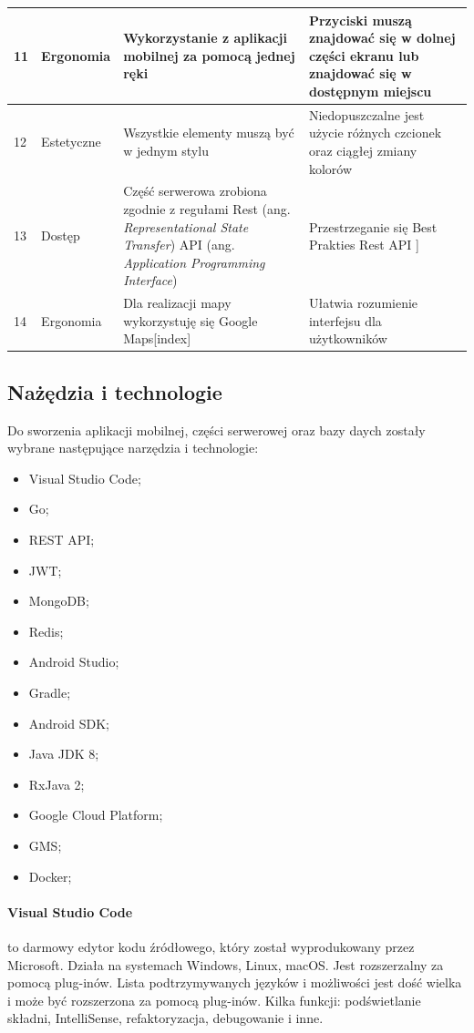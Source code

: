 \begin{table}[htb]
\begin{tabular}{| m{0.5cm} | m{3cm} | m{5.75cm} | m{5.75cm} |}
    \hline
    11 & Ergonomia & Wykorzystanie z aplikacji mobilnej za pomocą jednej ręki & Przyciski muszą znajdować się w dolnej części ekranu lub znajdować się w dostępnym miejscu \\
    \hline
    12 & Estetyczne & Wszystkie elementy muszą być w jednym stylu & Niedopuszczalne jest użycie różnych czcionek oraz ciągłej zmiany kolorów \\
    \hline
    13 & Dostęp & Część serwerowa zrobiona zgodnie z regułami Rest (ang. \textit{Representational State Transfer}) API (ang. \textit{Application Programming Interface}) & Przestrzeganie się Best Prakties Rest API \cite{rest_api_best}] \\
    \hline
    14 & Ergonomia & Dla realizacji mapy wykorzystuję się Google Maps[index] & Ułatwia rozumienie interfejsu dla użytkowników \\
    \hline
\end{tabular}
\end{table}
\newpage
\subsection{Nażędzia i technologie}
Do sworzenia aplikacji mobilnej, części serwerowej oraz bazy daych zostały wybrane następujące narzędzia i technologie:
\begin{multicols}{3}
\begin{itemize}
    \item Visual Studio Code;
    \item Go;
    \item REST API;
    \item JWT;
    \item MongoDB;
    \item Redis;
    \item Android Studio;
    \item Gradle;
    \item Android SDK;
    \item Java JDK 8;
    \item RxJava 2;
    \item Google Cloud Platform;
    \item GMS;
    \item Docker;
\end{itemize}
\end{multicols}
\paragraph{Visual Studio Code} \cite{vscode} to darmowy edytor kodu źródłowego, który został wyprodukowany przez Microsoft. Działa na systemach Windows, Linux, macOS. Jest rozszerzalny za pomocą plug-inów.
Lista podtrzymywanych języków i możliwości jest dość wielka i może być rozszerzona za pomocą plug-inów. Kilka funkcji: podświetlanie składni, IntelliSense, refaktoryzacja, debugowanie i inne.

